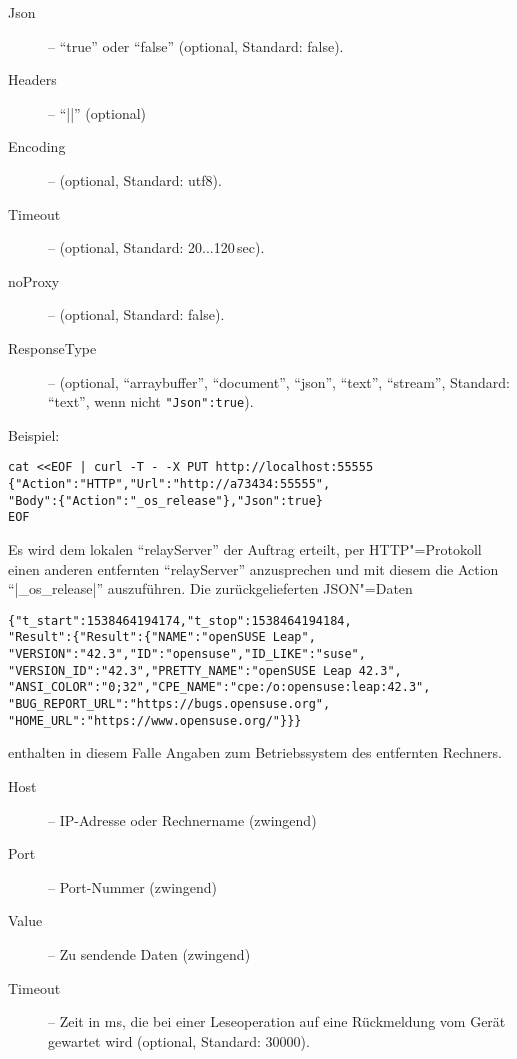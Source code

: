 \documentclass[titlepage=false,toc=nobibliography]{vl-report}
\newcommand*\theServer{relayServer}
\newcommand*\action[1]{\fbox{\nolinkurl{#1}}\medskip\par}
\begin{document}
\begin{description}
\begin{description}
\begin{description}
        \item[Json] -- "`true"' oder "`false"' (optional, Standard: false).
        \item[Headers] -- "`|{}|"' (optional)
        \item[Encoding] -- (optional, Standard: utf8).
        \item[Timeout] -- (optional, Standard: 20...120\,sec).
        \item[noProxy] -- (optional, Standard: false).
        \item[ResponseType ] -- (optional, "`arraybuffer"', "`document"', 
          "`json"', "`text"', "`stream"', Standard: "`text"', wenn nicht 
          \verb|"Json":true|).

      \end{description}
Beispiel:
\begin{lstlisting}[language={}]
cat <<EOF | curl -T - -X PUT http://localhost:55555
{"Action":"HTTP","Url":"http://a73434:55555",
"Body":{"Action":"_os_release"},"Json":true}
EOF
\end{lstlisting}
Es wird dem lokalen "`\theServer"' der Auftrag erteilt, per HTTP"=Protokoll 
einen anderen entfernten "`\theServer"' anzusprechen und mit diesem die Action  
"`|_os_release|"' auszuführen. Die zurückgelieferten JSON"=Daten
\begin{lstlisting}[language={}]
{"t_start":1538464194174,"t_stop":1538464194184,
"Result":{"Result":{"NAME":"openSUSE Leap",
"VERSION":"42.3","ID":"opensuse","ID_LIKE":"suse",
"VERSION_ID":"42.3","PRETTY_NAME":"openSUSE Leap 42.3",
"ANSI_COLOR":"0;32","CPE_NAME":"cpe:/o:opensuse:leap:42.3",
"BUG_REPORT_URL":"https://bugs.opensuse.org",
"HOME_URL":"https://www.opensuse.org/"}}}
\end{lstlisting}
enthalten in diesem Falle Angaben zum Betriebssystem des entfernten Rechners.

    \item \action{UDP}

      \begin{description}

        \item[Host] -- IP-Adresse oder Rechnername (zwingend)

        \item[Port] -- Port-Nummer (zwingend)

        \item[Value] -- Zu sendende Daten (zwingend)
        
        \item[Timeout] -- Zeit in ms, die bei einer Leseoperation auf eine
        Rückmeldung vom Gerät gewartet wird (optional, Standard: 30000).


\end{description}
\end{description}
\end{description}
\end{document}
